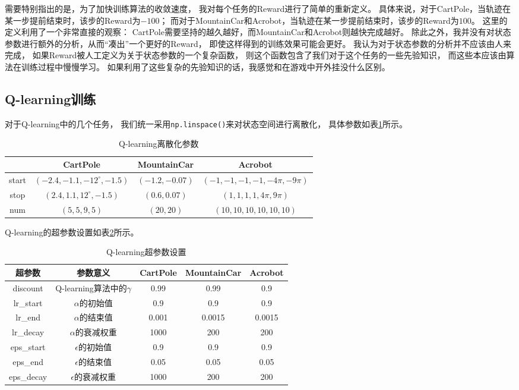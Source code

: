 \documentclass[a4paper,UTF8]{article}
\theoremstyle{definition}
\begin{document}
需要特别指出的是，为了加快训练算法的收敛速度，
我对每个任务的Reward进行了简单的重新定义。
具体来说，对于CartPole，当轨迹在某一步提前结束时，该步的Reward为$-100$；
而对于MountainCar和Acrobot，当轨迹在某一步提前结束时，该步的Reward为$100$。
这里的定义利用了一个非常直接的观察：
CartPole需要坚持的越久越好，而MountainCar和Acrobot则越快完成越好。
除此之外，我并没有对状态参数进行额外的分析，从而“凑出”一个更好的Reward，
即使这样得到的训练效果可能会更好。
我认为对于状态参数的分析并不应该由人来完成，
如果Reward被人工定义为关于状态参数的一个复杂函数，
则这个函数包含了我们对于这个任务的一些先验知识，
而这些本应该由算法在训练过程中慢慢学习。
如果利用了这些复杂的先验知识的话，我感觉和在游戏中开外挂没什么区别。

\subsection*{Q-learning训练}

对于Q-learning中的几个任务，
我们统一采用\lstinline[language=Python]{np.linspace()}来对状态空间进行离散化，
具体参数如表\ref{tab:disc-ql}所示。

\begin{table}[H]
	\centering
	\caption{Q-learning离散化参数}\label{tab:disc-ql}
	\begin{tabular}{c|ccc}
		\toprule
		& CartPole & MountainCar & Acrobot \\
		\midrule
		start & $(-2.4, -1.1, -12^\circ, -1.5)$ & $(-1.2, -0.07)$ & $(-1, -1, -1, -1, -4\pi, -9\pi)$ \\
		stop & $(2.4, 1.1, 12^\circ, -1.5)$ & $(0.6, 0.07)$ & $(1, 1, 1, 1, 4\pi, 9\pi)$ \\
		num & $(5, 5, 9, 5)$ & $(20, 20)$ & $(10, 10, 10, 10, 10, 10)$ \\
		\bottomrule
	\end{tabular}
\end{table}

Q-learning的超参数设置如表\ref{tab:arg-ql}所示。

\begin{table}[H]
	\centering
	\caption{Q-learning超参数设置}\label{tab:arg-ql}
	\begin{tabular}{ccccc}
		\toprule
		超参数 & 参数意义 & CartPole & MountainCar & Acrobot \\
		\midrule
		discount & Q-learning算法中的$\gamma$ & 0.99 & 0.99 & 0.9 \\
		lr\_start & $\alpha$的初始值 & 0.9 & 0.9 & 0.9 \\
		lr\_end & $\alpha$的结束值 & 0.001 & 0.0015 & 0.0015 \\
		lr\_decay & $\alpha$的衰减权重 & 1000 & 200 & 200 \\
		eps\_start & $\epsilon$的初始值 & 0.9 & 0.9 & 0.9 \\
		eps\_end & $\epsilon$的结束值 & 0.05 & 0.05 & 0.05\\
		eps\_decay & $\epsilon$的衰减权重 & 1000 & 200 & 200 \\
		\bottomrule
	\end{tabular}
\end{table}
\end{document}
